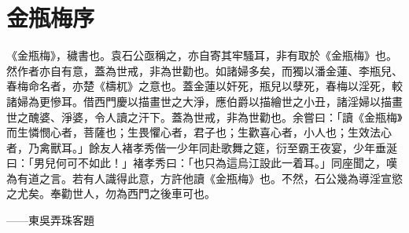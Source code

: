 \chapter*{金瓶梅序}


《金瓶梅》，穢書也。袁石公亟稱之，亦自寄其牢騷耳，非有取於《金瓶梅》也。然作者亦自有意，蓋為世戒，非為世勸也。如諸婦多矣，而獨以潘金蓮、李瓶兒、春梅命名者，亦楚《檮杌》之意也。蓋金蓮以奸死，瓶兒以孽死，春梅以淫死，較諸婦為更慘耳。借西門慶以描畫世之大淨，應伯爵以描繪世之小丑，諸淫婦以描畫世之醜婆、淨婆，令人讀之汗下。蓋為世戒，非為世勸也。余嘗曰：「讀《金瓶梅》而生憐憫心者，菩薩也；生畏懼心者，君子也；生歡喜心者，小人也；生效法心者，乃禽獸耳。」餘友人褚孝秀偕一少年同赴歌舞之筵，衍至霸王夜宴，少年垂涎曰：「男兒何可不如此！」褚孝秀曰：「也只為這烏江設此一着耳。」同座聞之，嘆為有道之言。若有人識得此意，方許他讀《金瓶梅》也。不然，石公幾為導淫宣慾之尤矣。奉勸世人，勿為西門之後車可也。

——東吳弄珠客題

